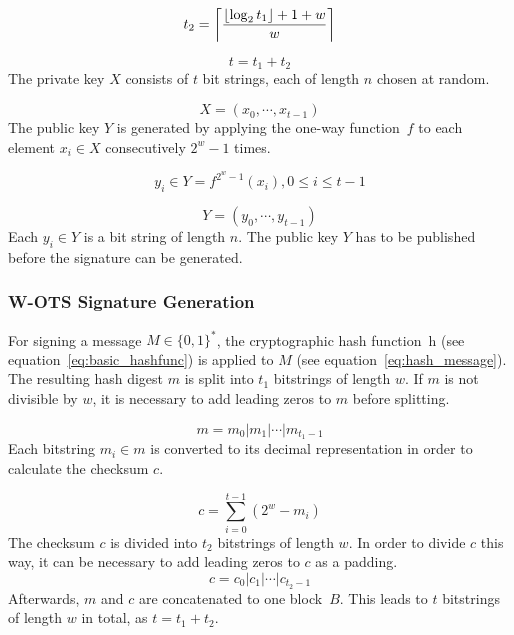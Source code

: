 \begin{equation}
\label{eq:t2}
t_2 = \ceil*{\frac{\floor*{\log_2 t_1} + 1 + w}{w} }
\end{equation}

\begin{equation}
\label{eq:t}
t = t_1 + t_2
\end{equation}
The private key $X$ consists of $t$ bit strings, each of length $n$ chosen at random.

\begin{equation}
\label{eq:wots_privkey}
X = (x_0, \cdots, x_{t-1})
\end{equation}
The public key $Y$ is generated by applying the one-way function~$f$ to each element $x_i  \in X$  consecutively $2^w - 1$ times. %

\begin{equation}
y_i \in Y =  f^{2^w-1}(x_i), 0 \leq i \leq t-1 
\end{equation}

\begin{equation}
Y = (y_0, \cdots, y_{t-1})
\end{equation}
Each $y_i \in Y$ is a bit string of length $n$. The public key $Y$ has to be published before the signature can be generated.

\subsubsection{W-OTS Signature Generation}
For signing a message $M \in \lbrace 0,1 \rbrace^*$, the cryptographic hash function~h (see equation~\ref{eq:basic_hashfunc}) is applied to $M$ (see equation~\ref{eq:hash_message}). The resulting hash digest $m$ is split into $t_1$ bitstrings of length $w$. If $m$ is not divisible by $w$, it is necessary to add leading zeros to $m$ before splitting.

\begin{equation}
\label{eq:hash_digest_split}
m = m_0 | m_1 | \cdots | m_{t_1-1}
\end{equation}
Each bitstring $m_i \in m$ is converted to its decimal representation in order to calculate the checksum $c$.

\begin{equation}
\label{eq:checksum_calculation}
c = \sum_{i = 0}^{t-1}(2^w-m_i)
\end{equation}
The checksum $c$ is divided into $t_2$ bitstrings of length $w$. In order to divide $c$ this way, it can be necessary to add leading zeros to $c$ as a padding.
\begin{equation}
c = c_0 | c_1 | \cdots | c_{t_2 - 1}
\end{equation}
Afterwards, $m$ and $c$ are concatenated to one block~$B$. This leads to $t$ bitstrings of length $w$ in total, as $t = t_1 + t_2$.

